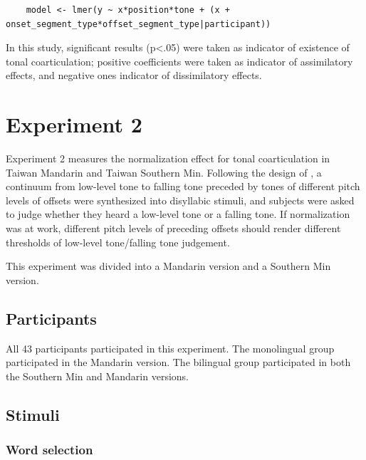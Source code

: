 \begin{lstlisting}
    model <- lmer(y ~ x*position*tone + (x + onset_segment_type*offset_segment_type|participant))
\end{lstlisting}

In this study, significant results (p<.05) were taken as indicator of existence of tonal coarticulation; positive coefficients were taken as indicator of assimilatory effects, and negative ones indicator of dissimilatory effects.

\section{Experiment 2}\label{section:Experiment2}

Experiment 2 measures the normalization effect for tonal coarticulation in Taiwan Mandarin and Taiwan Southern Min. Following the design of \cite{Zhangetal2022}, a continuum from low-level tone to falling tone preceded by tones of different pitch levels of offsets were synthesized into disyllabic stimuli, and subjects were asked to judge whether they heard a low-level tone or a falling tone. If normalization was at work, different pitch levels of preceding offsets should render different thresholds of low-level tone/falling tone judgement.

This experiment was divided into a Mandarin version and a Southern Min version.

\subsection{Participants}
All 43 participants participated in this experiment. The monolingual group participated in the Mandarin version. The bilingual group participated in both the Southern Min and Mandarin versions.

\subsection{Stimuli}
\subsubsection{Word selection}

